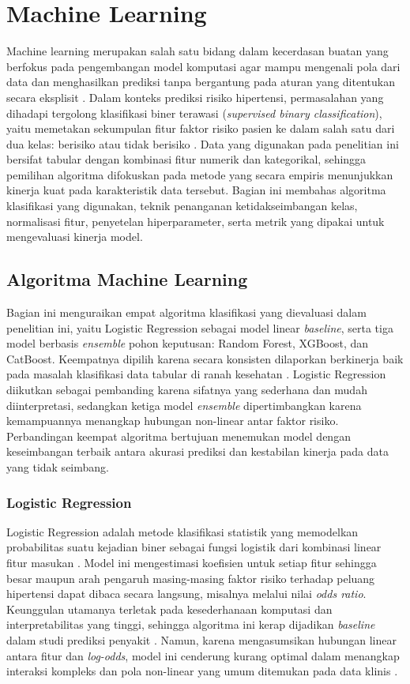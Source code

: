 \section{Machine Learning}
Machine learning merupakan salah satu bidang dalam kecerdasan buatan yang berfokus pada pengembangan model komputasi agar mampu mengenali pola dari data dan menghasilkan prediksi tanpa bergantung pada aturan yang ditentukan secara eksplisit \autocite{Sarker2021}. Dalam konteks prediksi risiko hipertensi, permasalahan yang dihadapi tergolong klasifikasi biner terawasi (\emph{supervised binary classification}), yaitu memetakan sekumpulan fitur faktor risiko pasien ke dalam salah satu dari dua kelas: berisiko atau tidak berisiko \autocite{Sarker2021}. Data yang digunakan pada penelitian ini bersifat tabular dengan kombinasi fitur numerik dan kategorikal, sehingga pemilihan algoritma difokuskan pada metode yang secara empiris menunjukkan kinerja kuat pada karakteristik data tersebut. Bagian ini membahas algoritma klasifikasi yang digunakan, teknik penanganan ketidakseimbangan kelas, normalisasi fitur, penyetelan hiperparameter, serta metrik yang dipakai untuk mengevaluasi kinerja model.

\subsection{Algoritma Machine Learning}
Bagian ini menguraikan empat algoritma klasifikasi yang dievaluasi dalam penelitian ini, yaitu Logistic Regression sebagai model linear \emph{baseline}, serta tiga model berbasis \emph{ensemble} pohon keputusan: Random Forest, XGBoost, dan CatBoost. Keempatnya dipilih karena secara konsisten dilaporkan berkinerja baik pada masalah klasifikasi data tabular di ranah kesehatan \autocite{Septian2025Prediction}. Logistic Regression diikutkan sebagai pembanding karena sifatnya yang sederhana dan mudah diinterpretasi, sedangkan ketiga model \emph{ensemble} dipertimbangkan karena kemampuannya menangkap hubungan non-linear antar faktor risiko. Perbandingan keempat algoritma bertujuan menemukan model dengan keseimbangan terbaik antara akurasi prediksi dan kestabilan kinerja pada data yang tidak seimbang.

\subsubsection{Logistic Regression}
Logistic Regression adalah metode klasifikasi statistik yang memodelkan probabilitas suatu kejadian biner sebagai fungsi logistik dari kombinasi linear fitur masukan \autocite{Hosmer2013Applied}. Model ini mengestimasi koefisien untuk setiap fitur sehingga besar maupun arah pengaruh masing-masing faktor risiko terhadap peluang hipertensi dapat dibaca secara langsung, misalnya melalui nilai \emph{odds ratio}. Keunggulan utamanya terletak pada kesederhanaan komputasi dan interpretabilitas yang tinggi, sehingga algoritma ini kerap dijadikan \emph{baseline} dalam studi prediksi penyakit \autocite{Zhang2025Machine}. Namun, karena mengasumsikan hubungan linear antara fitur dan \emph{log-odds}, model ini cenderung kurang optimal dalam menangkap interaksi kompleks dan pola non-linear yang umum ditemukan pada data klinis \autocite{Tarimana2024}.


